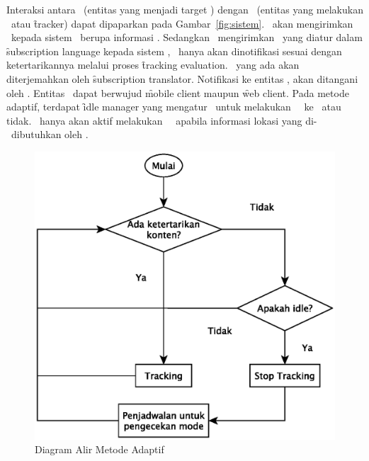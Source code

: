 Interaksi antara \publisher~(entitas yang menjadi target \tracking) dengan
\subscriber~(entitas yang melakukan \tracking~atau \f{tracker}) dapat dipaparkan
pada Gambar~\ref{fig:sistem}.  \Publisher~akan mengirimkan \event~kepada sistem
\pubsub~berupa informasi \tracking.  Sedangkan \subscriber~mengirimkan
\subscription~yang diatur dalam \f{subscription language} kepada sistem \pubsub,
\subscriber~hanya akan dinotifikasi sesuai dengan ketertarikannya melalui proses
\f{tracking evaluation}. \Subscription~yang ada akan diterjemahkan oleh
\f{subscription translator}. Notifikasi ke entitas \subscriber, akan ditangani
oleh \broker. Entitas \subscriber~dapat berwujud \f{mobile client} maupun \f{web
  client}. Pada metode adaptif, terdapat \f{idle manager} yang mengatur
\publisher~untuk melakukan \event~\publish~ke \broker~atau tidak.
\Publisher~hanya akan aktif melakukan \event~\publish~apabila informasi lokasi
yang di-\publish~dibutuhkan oleh \subscriber.


\noindent
\begin{figure}
  \centering
  \includegraphics[scale=0.70]
  {images/3-adaptive-tracking}
  \caption{Diagram Alir Metode Adaptif}
\label{fig:adaptive_tracking}
\end{figure}

